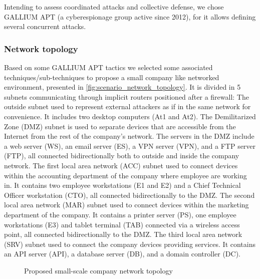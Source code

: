 \noindent
Intending to assess coordinated attacks and collective defense, we chose GALLIUM APT (a cyberespionage group active since 2012), for it allows defining several concurrent attacks.


\subsubsection{Network topology}


\noindent
Based on some GALLIUM APT tactics we selected some associated techniques/sub-techniques to propose a small company like networked environment, presented in \autoref{fig:scenario_network_topology}. It is divided in 5 subnets communicating through implicit routers positioned after a firewall:
The outside subnet used to represent external attackers as if in the same network for convenience. It includes two desktop computers (At1 and At2).
The Demilitarized Zone (DMZ) subnet is used to separate devices that are accessible from the Internet from the rest of the company's network. The servers in the DMZ include a web server (WS), an email server (ES), a VPN server (VPN), and a FTP server (FTP), all connected bidirectionally both to outside and inside the company network.
The first local area network (ACC) subnet used to connect devices within the accounting department of the company where employee are working in. It contains two employee workstations (E1 and E2) and a Chief Technical Officer workstation (CTO), all connected bidirectionally to the DMZ. %
The second local area network (MAR) subnet used to connect devices within the marketing department of the company. It contains a printer server (PS), one employee workstations (E3) and tablet terminal (TAB) connected via a wireless access point, all connected bidirectionally to the DMZ. %
The third local area network (SRV) subnet used to connect the company devices providing services. It contains an API server (API), a database server (DB), and a domain controller (DC).

\begin{figure}
    \centering
    
    \caption{Proposed small-scale company network topology}
    \label{fig:scenario_network_topology}
\end{figure}


